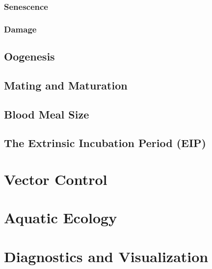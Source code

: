 \documentclass{article}
\begin{document}
\subsubsection{Senescence}

\subsubsection{Damage}

\subsection{Oogenesis}

\subsection{Mating and Maturation}

\subsection{Blood Meal Size}

\subsection{The Extrinsic Incubation Period (EIP)}

\section{Vector Control}

\section{Aquatic Ecology}

\section{Diagnostics and Visualization}
\end{document}
